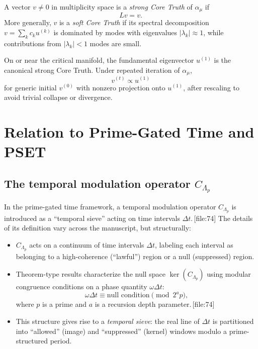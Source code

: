 \documentclass[11pt]{article}
\begin{document}
\begin{definition}
A vector \(v \neq 0\) in multiplicity space is a \emph{strong Core Truth} of \(\alpha_\mu\) if
\[
L v = v.
\]
More generally, \(v\) is a \emph{soft Core Truth} if its spectral decomposition \(v = \sum_k c_k u^{(k)}\) is dominated by modes with eigenvalues \(|\lambda_k| \approx 1\), while contributions from \(|\lambda_k| < 1\) modes are small.
\end{definition}

On or near the critical manifold, the fundamental eigenvector \(u^{(1)}\) is the canonical strong Core Truth. Under repeated iteration of \(\alpha_\mu\),
\[
v^{(t)} \propto u^{(1)}
\]
for generic initial \(v^{(0)}\) with nonzero projection onto \(u^{(1)}\), after rescaling to avoid trivial collapse or divergence.

\section{Relation to Prime-Gated Time and PSET}

\subsection{The temporal modulation operator \(C_{\Lambda_p}\)}

In the prime-gated time framework, a temporal modulation operator \(C_{\Lambda_p}\) is introduced as a ``temporal sieve'' acting on time intervals \(\Delta t\).\,[file:74] The details of its definition vary across the manuscript, but structurally:
\begin{itemize}
  \item \(C_{\Lambda_p}\) acts on a continuum of time intervals \(\Delta t\), labeling each interval as belonging to a high-coherence (``lawful'') region or a null (suppressed) region.
  \item Theorem-type results characterize the null space \(\ker(C_{\Lambda_p})\) using modular congruence conditions on a phase quantity \(\omega \Delta t\):
  \[
  \omega \Delta t \equiv \text{null condition} \pmod{2^a p},
  \]
  where \(p\) is a prime and \(a\) is a recursion depth parameter.\,[file:74]
  \item This structure gives rise to a \emph{temporal sieve}: the real line of \(\Delta t\) is partitioned into ``allowed'' (image) and ``suppressed'' (kernel) windows modulo a prime-structured period.
\end{itemize}
\end{document}
